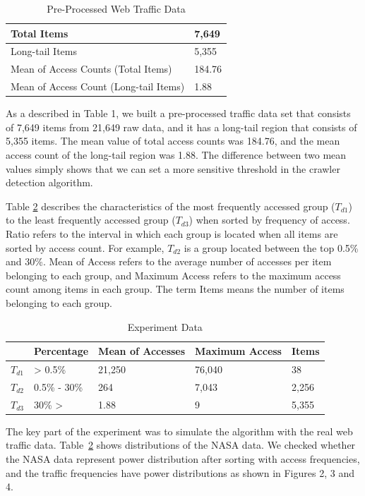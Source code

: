 \documentclass[sigconf,review]{acmart}
\begin{document}
\begin{table}[H]
  \caption{Pre-Processed Web Traffic Data}
    \begin{tabular}{ p{3.1cm} | p{2cm} }
    \hline
    Total Items & 7,649 \\ \hline
    Long-tail Items & 5,355 \\ \hline
    Mean of Access Counts (Total Items) & 184.76 \\ \hline
    Mean of Access Count (Long-tail Items) & 1.88 \\ \hline
    \end{tabular}
  \label{tab:preprocessing}
\end{table}

As a described in Table 1, we built a pre-processed traffic data set that consists of 7,649 items from 21,649 raw data, and it has a long-tail region that consists of 5,355 items. The mean value of total access counts was 184.76, and the mean access count of the long-tail region was 1.88. The difference between two mean values simply shows that we can set a more sensitive threshold in the crawler detection algorithm.

Table \ref{tab:expData} describes the characteristics of the most frequently accessed group ($T_{d1}$) to the least frequently accessed group ($T_{d3}$) when sorted by frequency of access. Ratio refers to the interval in which each group is located when all items are sorted by access count. For example, $T_{d2}$ is a group located between the top 0.5\% and 30\%. Mean of Access refers to the average number of accesses per item belonging to each group, and Maximum Access refers to the maximum access count among items in each group. The term Items means the number of items belonging to each group.

\begin{table}[H]
  \caption{Experiment Data}
    \begin{tabular}{ l | l | l | l | l  }
    \hline
    & Percentage & Mean of Accesses & Maximum Access & Items \\ \hline
    $T_{d1}$ &  > 0.5\% & 21,250 & 76,040 & 38 \\ 
    $T_{d2}$ & 0.5\% - 30\% & 264 & 7,043 & 2,256 \\
    $T_{d3}$ & 30\% > & 1.88 & 9 & 5,355 \\ \hline
    \end{tabular}
\label{tab:expData}
\end{table}

The key part of the experiment was to simulate the algorithm with the real web traffic data. Table~\ref{tab:expData} shows distributions of the NASA data. We checked whether the NASA data represent power distribution after sorting with access frequencies, and the traffic frequencies have power distributions as shown in Figures 2, 3 and 4.
\end{document}
